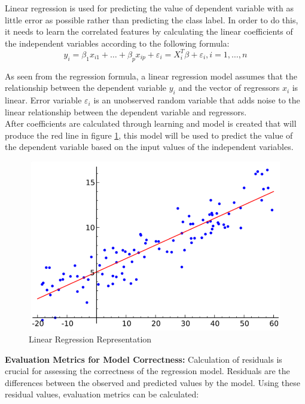 Linear regression is used for predicting the value of dependent variable with as little error as possible rather than predicting the class label. In order to do this, it needs to learn the correlated features by calculating the linear coefficients of the independent variables according to the following formula:\\ 

\begin{equation*}
y_{i}=\beta_{1}x_{i1}+\ldots+\beta_{p}x_{ip}+\varepsilon_{i}=X_{i}^{T}\beta+\varepsilon_{i}, i=1,\ldots,n
\end{equation*}

As seen from the regression formula, a linear regression model assumes that the relationship between the dependent variable $y_{i}$ and the vector of regressors $x_i$ is linear. Error variable $\varepsilon_{i}$ is an unobserved random variable that adds noise to the linear relationship between the dependent variable and regressors.\\

After coefficients are calculated through learning and model is created that will produce the red line in figure \ref{Regression}, this model will be used to predict the value of the dependent variable based on the input values of the independent variables.\\
\begin{figure}[H]
\begin{center}
\includegraphics[width=14.5cm,height=7.5cm]{chapter2prime/lr.png}
\end{center}
\caption{Linear Regression Representation}
\label{Regression}
\end{figure}


\textbf{Evaluation Metrics for Model Correctness:} Calculation of residuals is crucial for assessing the correctness of the regression model. Residuals are the differences between the observed and predicted values by the model. Using these residual values, evaluation metrics can be calculated:\\

